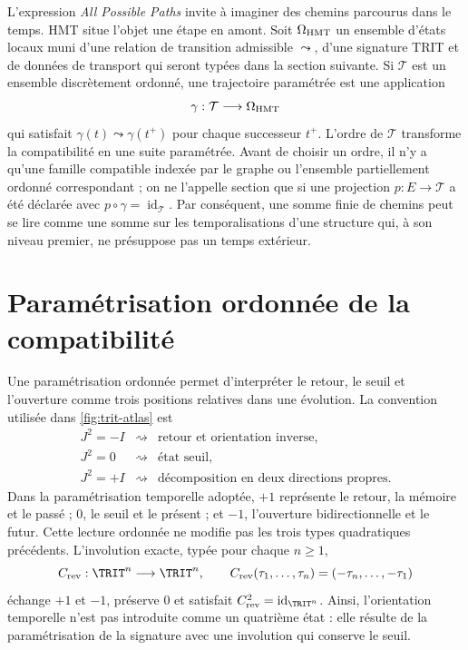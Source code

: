 L'expression \emph{All Possible Paths} invite à imaginer des chemins parcourus dans
le temps. HMT situe l'objet une étape en amont. Soit \(\Omega_{\rm HMT}\) un
ensemble d'états locaux muni d'une relation de transition admissible
\(\leadsto\), d'une signature TRIT et de données de transport qui seront typées dans la
section suivante. Si
\(\mathcal T\) est un ensemble discrètement ordonné, une trajectoire
paramétrée est une application
\[
\gamma:\mathcal T\longrightarrow\Omega_{\rm HMT}
\]
qui satisfait \(\gamma(t)\leadsto\gamma(t^+)\) pour chaque successeur \(t^+\).
L'ordre de \(\mathcal T\) transforme la compatibilité en une suite
paramétrée. Avant de choisir un ordre, il n'y a qu'une famille compatible
indexée par le graphe ou l'ensemble partiellement ordonné correspondant ; on ne l'appelle section que
si une projection \(p:E\to\mathcal T\) a été déclarée avec
\(p\circ\gamma=\operatorname{id}_{\mathcal T}\).
Par conséquent, une somme finie de chemins peut se lire comme une somme sur les
temporalisations d'une structure qui, à son niveau premier, ne présuppose pas
un temps extérieur.

\section{Paramétrisation ordonnée de la compatibilité}

Une paramétrisation ordonnée permet d'interpréter le retour, le seuil et l'ouverture
comme trois positions relatives dans une évolution. La convention utilisée dans
\cref{fig:trit-atlas} est
\[
\begin{array}{ccl}
J^2=-I&\rightsquigarrow&\text{retour et orientation inverse},\\
J^2=0&\rightsquigarrow&\text{état seuil},\\
J^2=+I&\rightsquigarrow&\text{décomposition en deux directions propres}.
\end{array}
\]
Dans la paramétrisation temporelle adoptée, \(+1\) représente
le retour, la mémoire et le passé ; \(0\), le seuil et le présent ; et \(-1\), l'ouverture
bidirectionnelle et le futur. Cette lecture ordonnée ne modifie pas les trois types
quadratiques précédents.
L'involution exacte, typée pour chaque \(n\geq1\),
\[
C_{\rm rev}:\TRIT^n\longrightarrow\TRIT^n,
\qquad
C_{\rm rev}(\tau_1,\ldots,\tau_n)=(-\tau_n,\ldots,-\tau_1)
\]
échange \(+1\) et \(-1\), préserve \(0\) et satisfait
\(C_{\rm rev}^2=\operatorname{id}_{\TRIT^n}\).
Ainsi, l'orientation temporelle n'est pas introduite comme un quatrième état : elle résulte
de la paramétrisation de la signature avec une involution qui conserve le
seuil.

